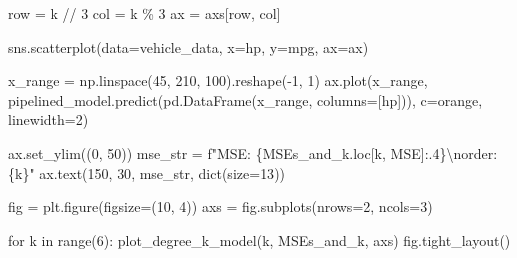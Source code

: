 \documentclass[
  letterpaper,
  DIV=11,
  numbers=noendperiod]{scrreprt}
\newenvironment{Shaded}{\begin{snugshade}}{\end{snugshade}}
\newcommand{\BuiltInTok}[1]{\textcolor[rgb]{0.00,0.23,0.31}{#1}}
\newcommand{\CharTok}[1]{\textcolor[rgb]{0.13,0.47,0.30}{#1}}
\newcommand{\ControlFlowTok}[1]{\textcolor[rgb]{0.00,0.23,0.31}{#1}}
\newcommand{\DecValTok}[1]{\textcolor[rgb]{0.68,0.00,0.00}{#1}}
\newcommand{\KeywordTok}[1]{\textcolor[rgb]{0.00,0.23,0.31}{#1}}
\newcommand{\NormalTok}[1]{\textcolor[rgb]{0.00,0.23,0.31}{#1}}
\newcommand{\OperatorTok}[1]{\textcolor[rgb]{0.37,0.37,0.37}{#1}}
\newcommand{\SpecialCharTok}[1]{\textcolor[rgb]{0.37,0.37,0.37}{#1}}
\newcommand{\SpecialStringTok}[1]{\textcolor[rgb]{0.13,0.47,0.30}{#1}}
\newcommand{\StringTok}[1]{\textcolor[rgb]{0.13,0.47,0.30}{#1}}
\begin{document}
\begin{Shaded}
\begin{Highlighting}[]
\NormalTok{    row }\OperatorTok{=}\NormalTok{ k }\OperatorTok{//} \DecValTok{3}
\NormalTok{    col }\OperatorTok{=}\NormalTok{ k }\OperatorTok{\%} \DecValTok{3}
\NormalTok{    ax }\OperatorTok{=}\NormalTok{ axs[row, col]}
    
\NormalTok{    sns.scatterplot(data}\OperatorTok{=}\NormalTok{vehicle\_data, x}\OperatorTok{=}\StringTok{\textquotesingle{}hp\textquotesingle{}}\NormalTok{, y}\OperatorTok{=}\StringTok{\textquotesingle{}mpg\textquotesingle{}}\NormalTok{, ax}\OperatorTok{=}\NormalTok{ax)}
    
\NormalTok{    x\_range }\OperatorTok{=}\NormalTok{ np.linspace(}\DecValTok{45}\NormalTok{, }\DecValTok{210}\NormalTok{, }\DecValTok{100}\NormalTok{).reshape(}\OperatorTok{{-}}\DecValTok{1}\NormalTok{, }\DecValTok{1}\NormalTok{)}
\NormalTok{    ax.plot(x\_range, pipelined\_model.predict(pd.DataFrame(x\_range, columns}\OperatorTok{=}\NormalTok{[}\StringTok{\textquotesingle{}hp\textquotesingle{}}\NormalTok{])), c}\OperatorTok{=}\StringTok{\textquotesingle{}orange\textquotesingle{}}\NormalTok{, linewidth}\OperatorTok{=}\DecValTok{2}\NormalTok{)}
    
\NormalTok{    ax.set\_ylim((}\DecValTok{0}\NormalTok{, }\DecValTok{50}\NormalTok{))}
\NormalTok{    mse\_str }\OperatorTok{=} \SpecialStringTok{f"MSE: }\SpecialCharTok{\{}\NormalTok{MSEs\_and\_k}\SpecialCharTok{.}\NormalTok{loc[k, }\StringTok{\textquotesingle{}MSE\textquotesingle{}}\NormalTok{]}\SpecialCharTok{:.4\}}\CharTok{\textbackslash{}n}\SpecialStringTok{order: }\SpecialCharTok{\{}\NormalTok{k}\SpecialCharTok{\}}\SpecialStringTok{"}
\NormalTok{    ax.text(}\DecValTok{150}\NormalTok{, }\DecValTok{30}\NormalTok{, mse\_str, }\BuiltInTok{dict}\NormalTok{(size}\OperatorTok{=}\DecValTok{13}\NormalTok{))}

\NormalTok{fig }\OperatorTok{=}\NormalTok{ plt.figure(figsize}\OperatorTok{=}\NormalTok{(}\DecValTok{10}\NormalTok{, }\DecValTok{4}\NormalTok{))}
\NormalTok{axs }\OperatorTok{=}\NormalTok{ fig.subplots(nrows}\OperatorTok{=}\DecValTok{2}\NormalTok{, ncols}\OperatorTok{=}\DecValTok{3}\NormalTok{)}

\ControlFlowTok{for}\NormalTok{ k }\KeywordTok{in} \BuiltInTok{range}\NormalTok{(}\DecValTok{6}\NormalTok{):}
\NormalTok{    plot\_degree\_k\_model(k, MSEs\_and\_k, axs)}
\NormalTok{fig.tight\_layout()}
\end{Highlighting}
\end{Shaded}
\end{document}
